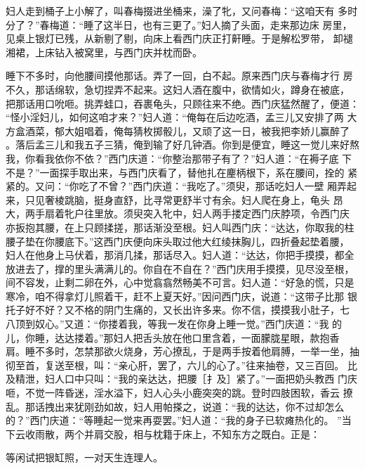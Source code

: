 妇人走到桶子上小解了，叫春梅掇进坐桶来，澡了牝，又问春梅：“这咱天有
多时分了？”春梅道：“睡了这半日，也有三更了。”妇人摘了头面，走来那边床
房里，见桌上银灯已残，从新剔了剔，向床上看西门庆正打鼾睡。于是解松罗带，
卸褪湘裙，上床钻入被窝里，与西门庆并枕而卧。

睡下不多时，向他腰间摸他那话。弄了一回，白不起。原来西门庆与春梅才行
房不久，那话绵软，急切捏弄不起来。这妇人酒在腹中，欲情如火，蹲身在被底，
把那话用口吮咂。挑弄蛙口，吞裹龟头，只顾往来不绝。西门庆猛然醒了，便道：
“怪小淫妇儿，如何这咱才来？”妇人道：“俺每在后边吃酒，孟三儿又安排了两
大方盒酒菜，郁大姐唱着，俺每猜枚掷骰儿，又顽了这一日，被我把李娇儿赢醉了
。落后孟三儿和我五子三猜，俺到输了好几钟酒。你到是便宜，睡这一觉儿来好熬
我，你看我依你不依？”西门庆道：“你整治那带子有了？”妇人道：“在褥子底
下不是？”一面探手取出来，与西门庆看了，替他扎在麈柄根下，系在腰间，拴的
紧紧的。又问：“你吃了不曾？”西门庆道：“我吃了。”须臾，那话吃妇人一壁
厢弄起来，只见奢棱跳脑，挺身直舒，比寻常更舒半寸有余。妇人爬在身上，龟头
昂大，两手扇着牝户往里放。须臾突入牝中，妇人两手搂定西门庆脖项，令西门庆
亦扳抱其腰，在上只顾揉搓，那话渐没至根。妇人叫西门庆：“达达，你取我的柱
腰子垫在你腰底下。”这西门庆便向床头取过他大红绫抹胸儿，四折叠起垫着腰，
妇人在他身上马伏着，那消几揉，那话尽入。妇人道：“达达，你把手摸摸，都全
放进去了，撑的里头满满儿的。你自在不自在？”西门庆用手摸摸，见尽没至根，
间不容发，止剩二卵在外，心中觉翕翕然畅美不可言。妇人道：“好急的慌，只是
寒冷，咱不得拿灯儿照着干，赶不上夏天好。”因问西门庆，说道：“这带子比那
银托子好不好？又不格的阴门生痛的，又长出许多来。你不信，摸摸我小肚子，七
八顶到奴心。”又道：“你搂着我，等我一发在你身上睡一觉。”西门庆道：“我
的儿，你睡，达达搂着。”那妇人把舌头放在他口里含着，一面朦胧星眼，款抱香
肩。睡不多时，怎禁那欲火烧身，芳心撩乱，于是两手按着他肩膊，一举一坐，抽
彻至首，复送至根，叫：“亲心肝，罢了，六儿的心了。”往来抽卷，又三百回。
比及精泄，妇人口中只叫：“我的亲达达，把腰［扌及］紧了。”一面把奶头教西
门庆咂，不觉一阵昏迷，淫水溢下，妇人心头小鹿突突的跳。登时四肢困软，香云
撩乱。那话拽出来犹刚劲如故，妇人用帕搽之，说道：“我的达达，你不过却怎么
的？”西门庆道：“等睡起一觉来再耍罢。”妇人道：“我的身子已软瘫热化的。
”当下云收雨散，两个并肩交股，相与枕籍于床上，不知东方之既白。正是：

等闲试把银缸照，一对天生连理人。